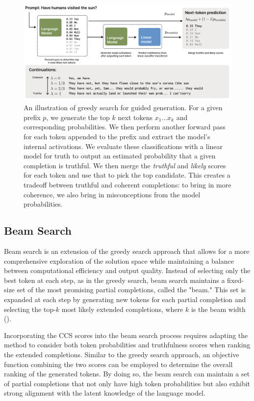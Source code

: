 \documentclass{article}
\begin{document}
\begin{figure}[h]
\includegraphics[width=1\textwidth]{greedy}
\caption{An illustration of greedy search for guided generation. For a given prefix $p$, we generate the top $k$ next tokens $x_1 ... x_k$ and corresponding probabilities. We then perform another forward pass for each token appended to the prefix and extract the model's internal activations. We evaluate these classifications with a linear model for truth to output an estimated probability  that a given completion is truthful. We then merge the {\em truthful} and {\em likely} scores for each token and use that to pick the top candidate. This creates a tradeoff between truthful and coherent completions: to bring in more coherence, we also bring in misconceptions from the model probabilities.}

\label{fig:figure2}
\end{figure}




\subsection{Beam Search}

Beam search is an extension of the greedy search approach that allows for a more comprehensive exploration of the solution space while maintaining a balance between computational efficiency and output quality. Instead of selecting only the best token at each step, as in the greedy search, beam search maintains a fixed-size set of the most promising partial completions, called the "beam." This set is expanded at each step by generating new tokens for each partial completion and selecting the top-$k$ most likely extended completions, where $k$ is the beam width (\cite{lemons2022beam}). 

Incorporating the CCS scores into the beam search process requires adapting the method to consider both token probabilities and truthfulness scores when ranking the extended completions. Similar to the greedy search approach, an objective function combining the two scores can be employed to determine the overall ranking of the generated tokens. By doing so, the beam search can maintain a set of partial completions that not only have high token probabilities but also exhibit strong alignment with the latent knowledge of the language model.
\end{document}

